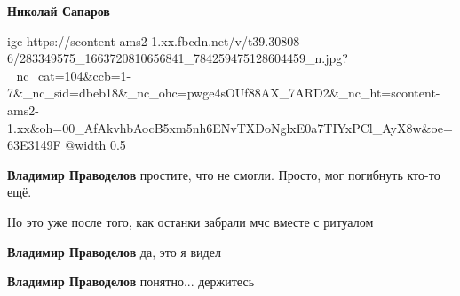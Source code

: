\textbf{Николай Сапаров}


\ifcmt
  igc https://scontent-ams2-1.xx.fbcdn.net/v/t39.30808-6/283349575_1663720810656841_784259475128604459_n.jpg?_nc_cat=104&ccb=1-7&_nc_sid=dbeb18&_nc_ohc=pwge4sOUf88AX_7ARD2&_nc_ht=scontent-ams2-1.xx&oh=00_AfAkvhbAocB5xm5nh6ENvTXDoNglxE0a7TIYxPCl_AyX8w&oe=63E3149F
	@width 0.5
\fi

\raggedcolumns
\begin{multicols}{2} %
\setlength{\parindent}{0pt}

\begin{itemize} %

\textbf{Владимир Праводелов} простите, что не смогли. Просто, мог погибнуть кто-то ещё.

Но это уже после того, как останки забрали мчс вместе с ритуалом

\textbf{Владимир Праводелов} да, это я видел

\textbf{Владимир Праводелов} понятно... держитесь

\end{itemize} %
\end{multicols} %

